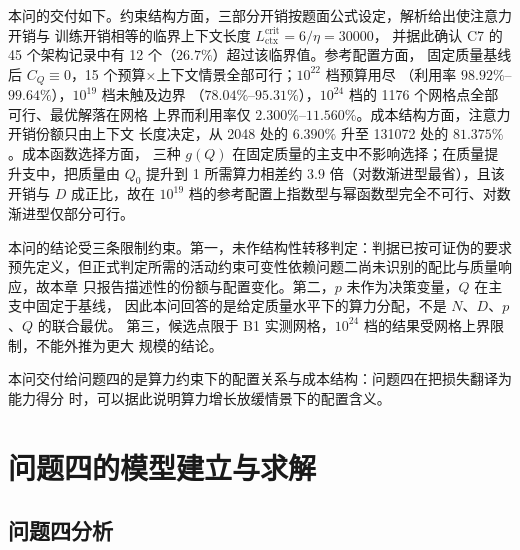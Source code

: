 \documentclass[bwprint]{gmcmthesis}
\numberwithin{equation}{section}
\numberwithin{figure}{section}
\numberwithin{table}{section}
\begin{document}
本问的交付如下。约束结构方面，三部分开销按题面公式设定，解析给出使注意力开销与
训练开销相等的临界上下文长度 $L_{\mathrm{ctx}}^{\mathrm{crit}}=6/\eta=30000$，
并据此确认 C7 的 45 个架构记录中有 12 个（$26.7\%$）超过该临界值。参考配置方面，
固定质量基线后 $C_Q\equiv0$，15 个预算×上下文情景全部可行；$10^{22}$ 档预算用尽
（利用率 $98.92\%$--$99.64\%$），$10^{19}$ 档未触及边界
（$78.04\%$--$95.31\%$），$10^{24}$ 档的 1176 个网格点全部可行、最优解落在网格
上界而利用率仅 $2.300\%$--$11.560\%$。成本结构方面，注意力开销份额只由上下文
长度决定，从 2048 处的 $6.390\%$ 升至 131072 处的 $81.375\%$。成本函数选择方面，
三种 $g(Q)$ 在固定质量的主支中不影响选择；在质量提升支中，把质量由 $Q_0$ 提升到
1 所需算力相差约 $3.9$ 倍（对数渐进型最省），且该开销与 $D$ 成正比，故在
$10^{19}$ 档的参考配置上指数型与幂函数型完全不可行、对数渐进型仅部分可行。

本问的结论受三条限制约束。第一，未作结构性转移判定：判据已按可证伪的要求
预先定义，但正式判定所需的活动约束可变性依赖问题二尚未识别的配比与质量响应，故本章
只报告描述性的份额与配置变化。第二，$p$ 未作为决策变量，$Q$ 在主支中固定于基线，
因此本问回答的是给定质量水平下的算力分配，不是 $N$、$D$、$p$、$Q$ 的联合最优。
第三，候选点限于 B1 实测网格，$10^{24}$ 档的结果受网格上界限制，不能外推为更大
规模的结论。

本问交付给问题四的是算力约束下的配置关系与成本结构：问题四在把损失翻译为能力得分
时，可以据此说明算力增长放缓情景下的配置含义。


\clearpage
\section{问题四的模型建立与求解}



\subsection{问题四分析}
\end{document}
